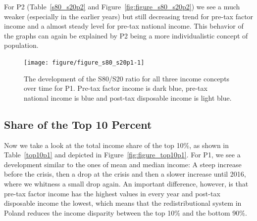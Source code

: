 \documentclass[a4paper]{article}\usepackage[]{graphicx}\usepackage[]{color}
\newenvironment{knitrout}{}{} %
\begin{document}
For P2 (Table~\ref{s80_s20p2} and Figure~\ref{fig:figure_s80_s20p2}) we see a much weaker (especially in the earlier years) but still decreasing trend for pre-tax factor income and a almost steady level for pre-tax national income. This behavior of the graphs can again be explained by P2 being a more individualistic concept of population.   
\begin{knitrout}
\color{fgcolor}\begin{figure}[H]

{\centering \texttt{[image: figure/figure\_s80\_s20p1-1]} 

}

\caption[The development of the S80/S20 ratio for all three income concepts over time for P1]{The development of the S80/S20 ratio for all three income concepts over time for P1. Pre-tax factor income is dark blue, pre-tax national income is blue and post-tax disposable income is light blue.}\label{fig:figure_s80_s20p1}
\end{figure}


\end{knitrout}

\subsection{Share of the Top 10 Percent}
Now we take a look at the total income share of the top 10\%, as shown in Table~\ref{top10p1} and depicted in Figure~\ref{fig:figure_top10p1}. For P1, we see a development similar to the ones of mean and median income: A steep increase before the crisis, then a drop at the crisis and then a slower increase until 2016, where we whitness a small drop again. An important difference, however, is that pre-tax factor income has the highest values in every year and post-tax disposable income the lowest, which means that the redistributional system in Poland reduces the income disparity between the top 10\% and the bottom 90\%.  
\end{document}
